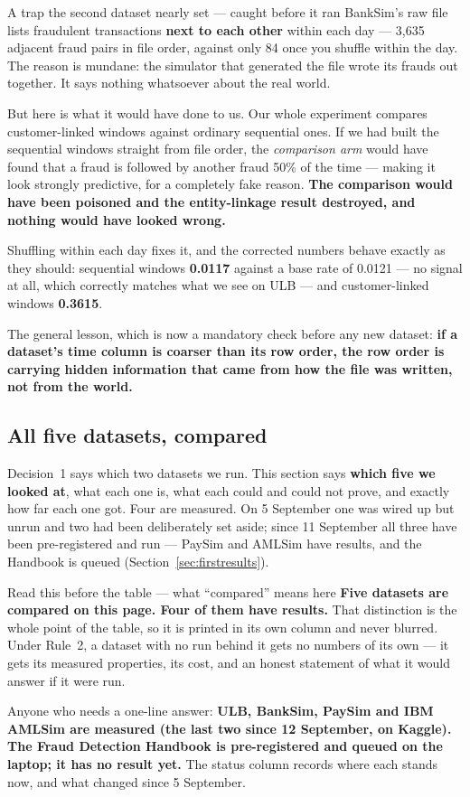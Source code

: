 \documentclass[11pt]{article}
\begin{document}
\begin{warnbox}{A trap the second dataset nearly set --- caught before it ran}
BankSim's raw file lists fraudulent transactions \textbf{next to each other} within each day ---
3{,}635 adjacent fraud pairs in file order, against only 84 once you shuffle within the day. The reason
is mundane: the simulator that generated the file wrote its frauds out together. It says nothing
whatsoever about the real world.

But here is what it would have done to us. Our whole experiment compares customer-linked windows against
ordinary sequential ones. If we had built the sequential windows straight from file order, the
\emph{comparison arm} would have found that a fraud is followed by another fraud 50\% of the time ---
making it look strongly predictive, for a completely fake reason. \textbf{The comparison would have been
poisoned and the entity-linkage result destroyed, and nothing would have looked wrong.}

Shuffling within each day fixes it, and the corrected numbers behave exactly as they should: sequential
windows \textbf{0.0117} against a base rate of 0.0121 --- no signal at all, which correctly matches what
we see on ULB --- and customer-linked windows \textbf{0.3615}.

The general lesson, which is now a mandatory check before any new dataset: \textbf{if a dataset's time
column is coarser than its row order, the row order is carrying hidden information that came from how
the file was written, not from the world.}
\end{warnbox}

\subsection{All five datasets, compared}
\label{sec:fivedatasets}

Decision~1 says which two datasets we run. This section says \textbf{which five we looked at}, what each
one is, what each could and could not prove, and exactly how far each one got. Four are measured. On
5 September one was wired up but unrun and two had been deliberately set aside; since 11 September all
three have been pre-registered and run --- PaySim and AMLSim have results, and the Handbook is queued
(Section~\ref{sec:firstresults}).

\begin{keybox}{Read this before the table --- what ``compared'' means here}
\textbf{Five datasets are compared on this page. Four of them have results.} That distinction is the
whole point of the table, so it is printed in its own column and never blurred. Under Rule~2, a dataset
with no run behind it gets no numbers of its own --- it gets its measured properties, its cost, and an
honest statement of what it would answer if it were run.

Anyone who needs a one-line answer: \textbf{ULB, BankSim, PaySim and IBM AMLSim are measured (the last
two since 12 September, on Kaggle). The Fraud Detection Handbook is pre-registered and queued on the
laptop; it has no result yet.} The
status column records where each stands now, and what changed since 5 September.
\end{keybox}
\end{document}
